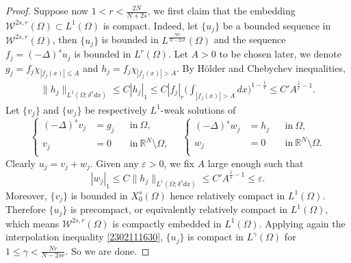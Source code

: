 \documentclass[10pt]{article}
\numberwithin{equation}{section}
\numberwithin{equation}{section}
\begin{document}
\begin{proof}
Suppose now $1<r< \frac{2N}{N+2s}$, we first claim that the embedding $\mathcal{W}^{2s, r}(\Omega)\subset L^{1}(\Omega)$ is compact. Indeed, let $\{u_j\}$ be a bounded sequence in $\mathcal{W}^{2s, r}(\Omega)$, then $\{u_j\}$ is bounded in $L^{\frac{Nr}{N-2sr}}(\Omega)$ and the sequence $f_j = (-\Delta)^{s} u_j$ is bounded in $L^r(\Omega)$. Let $A > 0$ to be chosen later, we denote $g_j = f_j\chi_{|f_j(x)|\le A}$ and $h_j = f_j\chi_{|f_j(x)|> A}$. By H\"older and Chebychev inequalities,
\begin{align*}
\|h_j\|_{L^1(\Omega; \delta^s dx)} \leq C|h_j|_1\leq C|f_j|_r\Big(\int_{|f_j(x)|> A} dx\Big)^{1-\frac{1}{r}} \le C'A^{\frac{1}{r}-1}.
\end{align*}
Let $\{v_j\}$ and $\{w_j\}$ be respectively $L^1$-weak solutions of
\begin{equation}\label{2306010025}
\left\{
\begin{split}
(-\Delta)^{s} v_j &=g_j &&\text{in}~\Omega,\\
v_j&=0 &&\text{in} ~ \mathbb{R}^N\setminus\Omega,\\
\end{split}
\right. \quad \left\{
\begin{split}
(-\Delta)^{s} w_j&=h_j &&\text{in}~\Omega,\\
w_j&=0 &&\text{in} ~ \mathbb{R}^N\setminus\Omega.\\
\end{split}
\right.
\end{equation}
Clearly $u_j=v_j+w_j$. Given any $\varepsilon>0$, we fix $A$ large enough such that 
\[
|w_j|_1\le C\|h_j\|_{L^1(\Omega; \delta^s dx)} \le C'A^{\frac{1}{r}-1} \le \varepsilon.
\]
Moreover, $\{v_j\}$ is bounded in $X_0^s(\Omega)$ hence relatively compact in $L^1(\Omega)$. Therefore $\{u_j\}$ is precompact, or equivalently relatively compact in $L^1(\Omega)$, which means $\mathcal{W}^{2s, r}(\Omega)$ is compactly embedded in $L^{1}(\Omega)$. Applying again the interpolation inequality \eqref{2302111630}, $\{u_j\}$ is compact in $L^\gamma(\Omega)$ for $1\le\gamma<\frac{Nr}{N-2sr}$. So we are done.
\end{proof}
\end{document}
